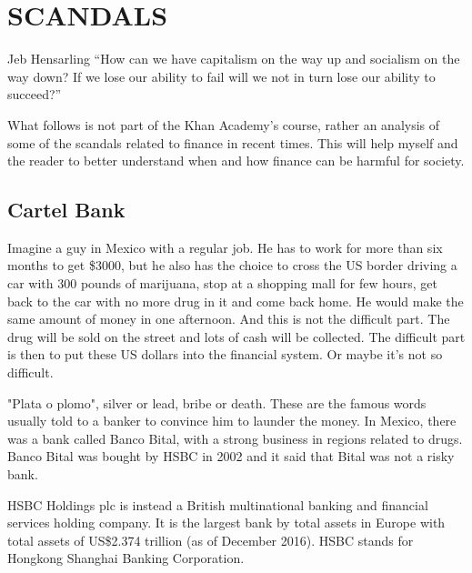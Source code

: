 \chapter{SCANDALS}
\begin{chapquote}{Jeb Hensarling}
``How can we have capitalism on the way up and socialism on the way down? If we lose our ability to fail will we not in turn lose our ability to succeed?''
\end{chapquote}

What follows is not part of the Khan Academy's course, rather an analysis of some of the scandals related to finance in recent times. This will help myself and the reader to better understand when and how finance can be harmful for society.

\section{Cartel Bank}
Imagine a guy in Mexico with a regular job. He has to work for more than six months to get \$3000, but he also has the choice to cross the US border driving a car with 300 pounds of marijuana, stop at a shopping mall for few hours, get back to the car with no more drug in it and come back home. He would make the same amount of money in one afternoon. And this is not the difficult part. The drug will be sold on the street and lots of cash will be collected. The difficult part is then to put these US dollars into the financial system. Or maybe it's not so difficult. 

"Plata o plomo", silver or lead, bribe or death. These are the famous words usually told to a banker to convince him to launder the money. In Mexico, there was a bank called Banco Bital, with a strong business in regions related to drugs. Banco Bital was bought by HSBC in 2002 and it said that Bital was not a risky bank.

HSBC Holdings plc is instead a British multinational banking and financial services holding company. It is the largest bank by total assets in Europe with total assets of US\$2.374 trillion (as of December 2016). HSBC stands for Hongkong Shanghai Banking Corporation.

